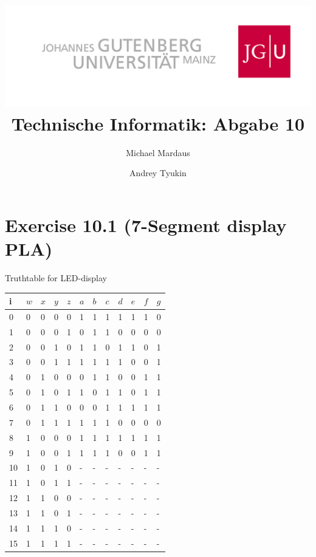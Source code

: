 \documentclass[10pt,a4paper]{scrartcl}
\author{Michael Mardaus \and Andrey Tyukin}
\title{\includegraphics[scale=0.2]{../logo_schriftzug}\\
Technische Informatik: Abgabe 10}
\begin{document}
\maketitle

\section*{Exercise 10.1 (7-Segment display PLA)}

Truthtable for LED-display\\
\begin{tabular}{|l||l|l|l|l||l|l|l|l|l|l|l|}\hline
i  & $w$ & $x$ & $y$ & $z$ &     $a$ & $b$ & $c$ & $d$ & $e$ & $f$ & $g$ \\\hline\hline
0  & 0   & 0   & 0   & 0   &      1  &  1  &  1  &  1  &  1  &  1  &  0  \\\hline
1  & 0   & 0   & 0   & 1   &      0  &  1  &  1  &  0  &  0  &  0  &  0  \\\hline
2  & 0   & 0   & 1   & 0   &      1  &  1  &  0  &  1  &  1  &  0  &  1  \\\hline
3  & 0   & 0   & 1   & 1   &      1  &  1  &  1  &  1  &  0  &  0  &  1  \\\hline
4  & 0   & 1   & 0   & 0   &      0  &  1  &  1  &  0  &  0  &  1  &  1  \\\hline
5  & 0   & 1   & 0   & 1   &      1  &  0  &  1  &  1  &  0  &  1  &  1  \\\hline
6  & 0   & 1   & 1   & 0   &      0  &  0  &  1  &  1  &  1  &  1  &  1  \\\hline
7  & 0   & 1   & 1   & 1   &      1  &  1  &  1  &  0  &  0  &  0  &  0  \\\hline
8  & 1   & 0   & 0   & 0   &      1  &  1  &  1  &  1  &  1  &  1  &  1  \\\hline
9  & 1   & 0   & 0   & 1   &      1  &  1  &  1  &  0  &  0  &  1  &  1  \\\hline
10 & 1   & 0   & 1   & 0   &      -  &  -  &  -  &  -  &  -  &  -  &  -  \\\hline
11 & 1   & 0   & 1   & 1   &      -  &  -  &  -  &  -  &  -  &  -  &  -  \\\hline
12 & 1   & 1   & 0   & 0   &      -  &  -  &  -  &  -  &  -  &  -  &  -  \\\hline
13 & 1   & 1   & 0   & 1   &      -  &  -  &  -  &  -  &  -  &  -  &  -  \\\hline
14 & 1   & 1   & 1   & 0   &      -  &  -  &  -  &  -  &  -  &  -  &  -  \\\hline
15 & 1   & 1   & 1   & 1   &      -  &  -  &  -  &  -  &  -  &  -  &  -  \\\hline
\end{tabular}
\end{document}
